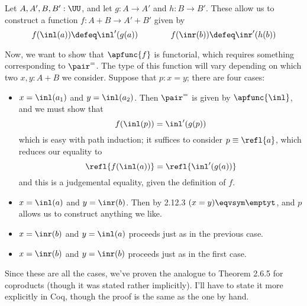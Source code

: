  \soln
Let $A, A', B, B' : \UU$, and let $g: A \to A'$ and $h: B \to B'$.  These allow
us to construct a function $f : A + B \to A' + B'$ given by
\[
  f(\inl(a)) \defeq \inl'(g(a))
  \qquad\qquad
  f(\inr(b)) \defeq \inr'(h(b))
\]


Now, we want to show that $\apfunc{f}$ is functorial, which requires something
corresponding to $\pair^{=}$.  The type of this function will vary depending on
which two $x, y : A+B$ we consider. Suppose that $p : x = y$; there are four
cases:



\begin{itemize}
\item  $x = \inl(a_{1})$ and $y = \inl(a_{2})$.  Then $\pair^{=}$ is given by
  $\apfunc{\inl}$, and we must show that
  \[
    f(\inl(p)) = \inl'(g(p))
  \]
  which is easy with path induction; it suffices to consider $p \equiv
  \refl{a}$, which reduces our equality to
  \[
    \refl{f(\inl(a))} = \refl{\inl'(g(a))}
  \]
  and this is a judgemental equality, given the definition of $f$.



\item  $x = \inl(a)$ and $y = \inr(b)$.  Then by 2.12.3 $(x = y) \eqvsym \emptyt$,
  and $p$ allows us to construct anything we like.



\item  $x = \inr(b)$ and $y = \inl(a)$ proceeds just as in the previous case.



\item  $x = \inr(b)$ and $y = \inr(b)$ proceeds just as in the first case.

\end{itemize}
Since these are all the cases, we've proven the analogue to Theorem 2.6.5 for
coproducts (though it was stated rather implicitly).  I'll have to state it
more explicitly in Coq, though the proof is the same as the one by
hand.
